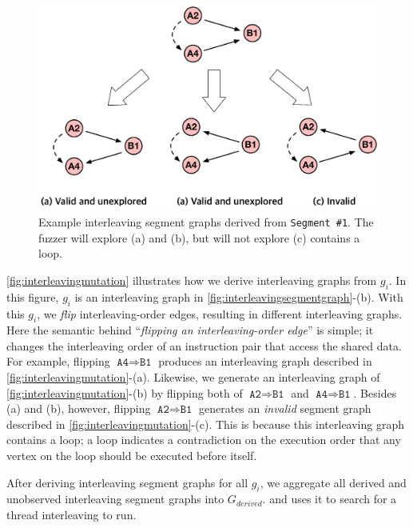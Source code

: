 \begin{figure}[t]
  \centering
  \includegraphics[width=0.9\linewidth]{fig/interleavingmutation.pdf}
  \caption{Example interleaving segment graphs derived from
    \texttt{Segment \#1}. The fuzzer will explore (a) and (b), but
    will not explore (c) contains a loop.}
  \label{fig:interleavingmutation}
\end{figure}
%
\autoref{fig:interleavingmutation} illustrates how we derive
interleaving graphs from $g_i$.
%
In this figure, $g_i$ is an interleaving graph in
\autoref{fig:interleavingsegmentgraph}-(b).
%
With this $g_i$, we \textit{flip} interleaving-order edges, resulting
in different interleaving graphs.
%
Here the semantic behind ``\textit{flipping an interleaving-order
  edge}'' is simple; it changes the interleaving order of an
instruction pair that access the shared data.
%
For example, flipping $\texttt{A4} \Rightarrow \texttt{B1}$ produces
an interleaving graph described in
\autoref{fig:interleavingmutation}-(a).
%
Likewise, we generate an interleaving graph of
\autoref{fig:interleavingmutation}-(b) by flipping both of
$\texttt{A2} \Rightarrow \texttt{B1}$ and
$\texttt{A4} \Rightarrow \texttt{B1}$.
%
%
Besides (a) and (b), however, flipping
$\texttt{A2} \Rightarrow \texttt{B1}$ generates an \textit{invalid}
segment graph described in \autoref{fig:interleavingmutation}-(c).
%
This is because this interleaving graph contains a loop; a loop
indicates a contradiction on the execution order that any vertex on
the loop should be executed before itself.







After deriving interleaving segment graphs for all $g_i$, we aggregate
all derived and unobserved interleaving segment graphs into
$G_{derived}$. and uses it to search for a thread interleaving to run.


